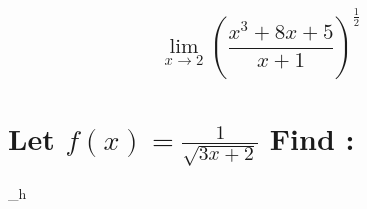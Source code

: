 \documentclass[5pt]{article}
\begin{document}
    \section*{}
    \section*{}
    \section*{}
    \subsection{$${\lim_{ x \to 2}}(\frac{x^3+8x+5}{x+1})^\frac{1}{2}$$}
    \section*{}
    \section*{}
    \section*{}
    \section*{}
    \section*{}
    \section*{}
    \section*{}
    \section*{}
    \section{ Let $f(x)=\frac{1}{\sqrt{3x+2}}$ Find :}
    $$\lim_{h }
    \section*{}
\end{document}
